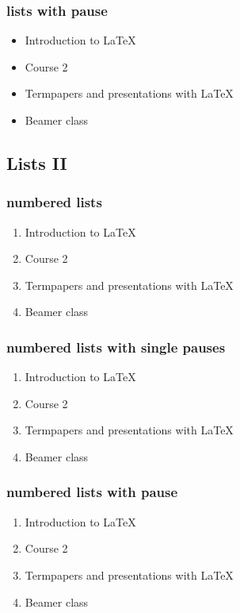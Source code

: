 \documentclass[hyperref={pdfpagelabels=false}]{beamer}
\begin{document}
\begin{frame}\frametitle{lists with pause}
\begin{itemize}[<+->]
\item Introduction to  \LaTeX{}  
\item Course 2
\item Termpapers and presentations with \LaTeX{}  
\item Beamer class
\end{itemize} 
\end{frame}



\subsection{Lists II}
\begin{frame}\frametitle{numbered lists}
\begin{enumerate}
\item Introduction to  \LaTeX{}   
\item Course 2 
\item Termpapers and presentations with \LaTeX{}  
\item Beamer class
\end{enumerate}
\end{frame}

\begin{frame}
\frametitle{numbered lists with single pauses}
\begin{enumerate}
\item Introduction to  \LaTeX{}  \pause 
\item Course 2 \pause 
\item Termpapers and presentations with \LaTeX{}  \pause 
\item Beamer class
\end{enumerate}
\end{frame}

\begin{frame}
\frametitle{numbered lists with pause}
\begin{enumerate}[<+->]
\item Introduction to  \LaTeX{}  
\item Course 2
\item Termpapers and presentations with \LaTeX{}  
\item Beamer class
\end{enumerate}
\end{frame}
\end{document}
